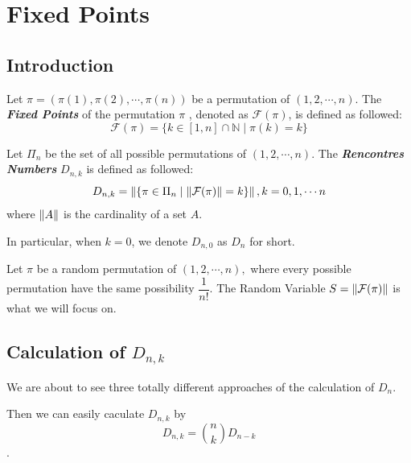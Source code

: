 \section{Fixed Points}
\subsection{Introduction}
Let $ \pi= (\pi(1), \pi(2),\cdots ,\pi(n))$ be a permutation of $ (1,2,\cdots ,n)$.
The \emph{\textbf{Fixed Points}} of the permutation $ \pi$ ,
denoted as $ \mathcal{F}(\pi)$, is defined as followed:
\[ \mathcal{F}(\pi) = \{ k \in [1,n]\cap \mathbb{N} \mid \pi(k) = k \}\]

Let $ \Pi_n$ be the set of all possible permutations of $ (1,2,\cdots ,n)$.
The \emph{\textbf{Rencontres Numbers}} $ D_{n,k}$ is defined as followed:
\[ D_{n,k} = \left\| \{ \pi \in \Pi_n \mid \left\|\mathcal{F}(\pi)\right\| = k \}\right\|, k = 0,1,\cdots n\]
where $ \left\|A\right\|$ is the cardinality of a set $ A$.

In particular, when $ k = 0$, we denote $ D_{n,0}$ as $  D_{n} $ for short.

Let $ \pi $ be a random permutation of $ (1,2,\cdots ,n),$ where
every possible permutation have the same possibility $ \dfrac{1}{n!}$.
The Random Variable $ S = \left\|\mathcal{F}(\pi)\right\| $ is what we will focus on.

\subsection{Calculation of $ D_{n,k}$}
\label{sec:f-calc}
We are about to see three totally different approaches of the calculation of $ D_{n}$.

Then we can easily caculate $ D_{n,k}$ by
\[ D_{n,k} = {n\choose{k}}D_{n-k}\].

